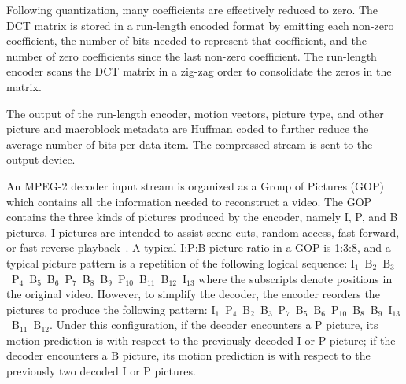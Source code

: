 
Following quantization, many coefficients are effectively reduced to
zero. The DCT matrix is stored in a run-length encoded format by emitting each 
non-zero coefficient, the number of bits needed to represent that coefficient, 
and the number of zero coefficients since the last non-zero coefficient. The
run-length encoder scans the DCT matrix in a zig-zag order
to consolidate the zeros in the matrix.

The output of the run-length encoder, motion vectors, picture type,
and other picture and macroblock metadata are Huffman coded to
further reduce the average number of bits per data item. The compressed
stream is sent to the output device.


An MPEG-2 decoder input stream is organized as a Group of Pictures
(GOP) which contains all the information needed to reconstruct a
video. The GOP contains the three kinds of pictures produced by the
encoder, namely I, P, and B pictures. I pictures are intended to
assist scene cuts, random access, fast forward, or fast reverse
playback~\cite[p. 14]{MPEG2}. A typical I:P:B picture ratio in a GOP
is 1:3:8, and a typical picture pattern is a repetition of the
following logical sequence:
I$_1$~B$_2$~B$_3$~P$_4$~B$_5$~B$_6$~P$_7$~B$_8$~B$_9$~P$_{10}$~B$_{11}$~B$_{12}$~I$_{13}$
where the subscripts denote positions in the original video.  However,
to simplify the decoder, the encoder reorders the pictures to produce
the following pattern:
I$_1$~P$_4$~B$_2$~B$_3$~P$_7$~B$_5$~B$_6$~P$_{10}$~B$_8$~B$_9$~I$_{13}$~B$_{11}$~B$_{12}$.
Under this configuration, if the decoder encounters a P picture, its
motion prediction is with respect to the previously decoded I or P
picture; if the decoder encounters a B picture, its motion prediction
is with respect to the previously two decoded I or P pictures.

